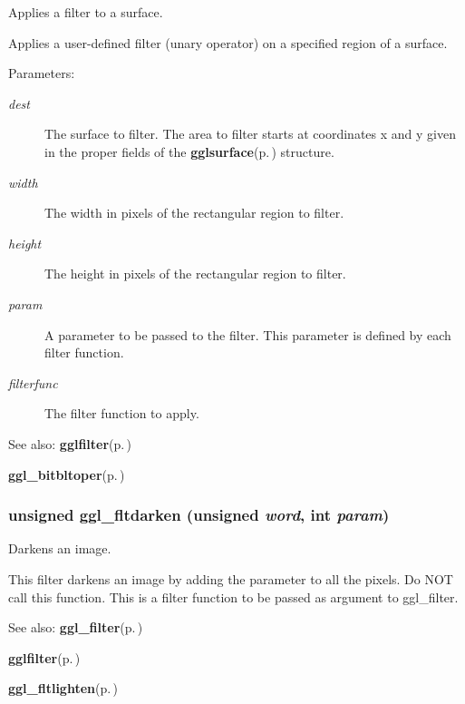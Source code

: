 Applies a filter to a surface. 

Applies a user-defined filter (unary operator) on a specified region of a surface.

\begin{Desc}
\item[Parameters:]
\begin{description}
\item[{\em dest}]The surface to filter. The area to filter starts at coordinates x and y given in the proper fields of the {\bf gglsurface}{\rm (p.\,\pageref{structgglsurface})} structure. \item[{\em width}]The width in pixels of the rectangular region to filter. \item[{\em height}]The height in pixels of the rectangular region to filter. \item[{\em param}]A parameter to be passed to the filter. This parameter is defined by each filter function. \item[{\em filterfunc}]The filter function to apply.\end{description}
\end{Desc}
\begin{Desc}
\item[See also:]{\bf gglfilter}{\rm (p.\,\pageref{ggl_8h_a7})} 

{\bf ggl\_\-bitbltoper}{\rm (p.\,\pageref{ggl_8h_a27})} \end{Desc}
\subsubsection{\setlength{\rightskip}{0pt plus 5cm}unsigned ggl\_\-fltdarken (unsigned {\em word}, int {\em param})}\label{ggl_8h_a29}


Darkens an image. 

This filter darkens an image by adding the parameter to all the pixels. Do NOT call this function. This is a filter function to be passed as argument to ggl\_\-filter.

\begin{Desc}
\item[See also:]{\bf ggl\_\-filter}{\rm (p.\,\pageref{ggl_8h_a26})} 

{\bf gglfilter}{\rm (p.\,\pageref{ggl_8h_a7})} 

{\bf ggl\_\-fltlighten}{\rm (p.\,\pageref{ggl_8h_a28})} \end{Desc}

